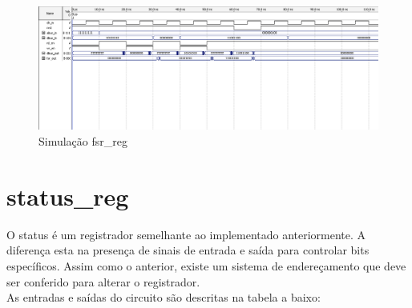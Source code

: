 \documentclass{article}
\begin{document}
\begin{figure}[ht]
    \begin{center}
        \includegraphics[width=15cm]{images/fsr_reg.png}
        \caption{Simulação fsr\_reg}
\end{center}
\end{figure}

\newpage

\section{status\_reg}

O status é um registrador semelhante ao implementado anteriormente. A diferença esta na presença de sinais de entrada e saída para controlar bits específicos. Assim como o anterior, existe um sistema de endereçamento que deve ser conferido para alterar o registrador.\\

As entradas e saídas do circuito são descritas na tabela a baixo:\\
\end{document}
